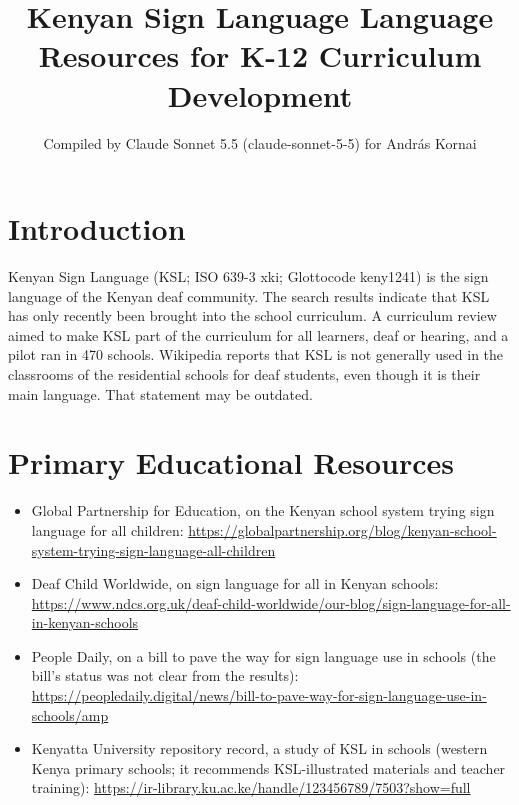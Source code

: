 \documentclass[12pt]{article}
\title{Kenyan Sign Language Language Resources for K-12 Curriculum Development}
\author{Compiled by Claude Sonnet 5.5 (claude-sonnet-5-5) for Andr\'as Kornai}
\date{}
\begin{document}
\maketitle

\section{Introduction}
Kenyan Sign Language (KSL; ISO 639-3 xki; Glottocode keny1241) is the sign language of the Kenyan deaf community. The search results indicate that KSL has only recently been brought into the school curriculum. A curriculum review aimed to make KSL part of the curriculum for all learners, deaf or hearing, and a pilot ran in 470 schools. Wikipedia reports that KSL is not generally used in the classrooms of the residential schools for deaf students, even though it is their main language. That statement may be outdated.

\section{Primary Educational Resources}
\begin{itemize}
\item Global Partnership for Education, on the Kenyan school system trying sign language for all children: \url{https://globalpartnership.org/blog/kenyan-school-system-trying-sign-language-all-children}
\item Deaf Child Worldwide, on sign language for all in Kenyan schools: \url{https://www.ndcs.org.uk/deaf-child-worldwide/our-blog/sign-language-for-all-in-kenyan-schools}
\item People Daily, on a bill to pave the way for sign language use in schools (the bill's status was not clear from the results): \url{https://peopledaily.digital/news/bill-to-pave-way-for-sign-language-use-in-schools/amp}
\item Kenyatta University repository record, a study of KSL in schools (western Kenya primary schools; it recommends KSL-illustrated materials and teacher training): \url{https://ir-library.ku.ac.ke/handle/123456789/7503?show=full}
\end{itemize}
\end{document}
